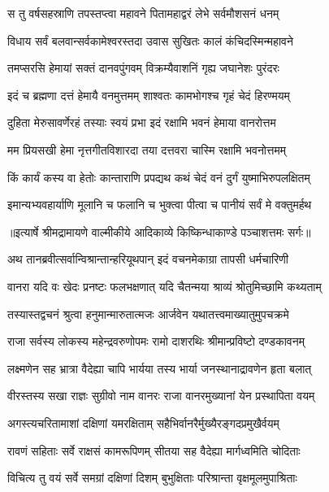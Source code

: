 \twolineshloka
{स तु वर्षसहस्राणि तपस्तप्त्वा महावने}
{पितामहाद्वरं लेभे सर्वमौशसनं धनम्} %

\twolineshloka
{विधाय सर्वं बलवान्सर्वकामेश्वरस्तदा}
{उवास सुखितः कालं कंचिदस्मिन्महावने} %

\twolineshloka
{तमप्सरसि हेमायां सक्तं दानवपुंगवम्}
{विक्रम्यैवाशनिं गृह्य जघानेशः पुरंदरः} %

\twolineshloka
{इदं च ब्रह्मणा दत्तं हेमायै वनमुत्तमम्}
{शाश्वतः कामभोगश्च गृहं चेदं हिरण्मयम्} %

\twolineshloka
{दुहिता मेरुसावर्णेरहं तस्याः स्वयं प्रभा}
{इदं रक्षामि भवनं हेमाया वानरोत्तम} %

\twolineshloka
{मम प्रियसखी हेमा नृत्तगीतविशारदा}
{तया दत्तवरा चास्मि रक्षामि भवनोत्तमम्} %

\twolineshloka
{किं कार्यं कस्य वा हेतोः कान्ताराणि प्रपद्यथ}
{कथं चेदं वनं दुर्गं युष्माभिरुपलक्षितम्} %

\twolineshloka
{इमान्यभ्यवहार्याणि मूलानि च फलानि च}
{भुक्त्वा पीत्वा च पानीयं सर्वं मे वक्तुमर्हथ} %


{॥इत्यार्षे श्रीमद्रामायणे वाल्मीकीये आदिकाव्ये किष्किन्धाकाण्डे पञ्चाशत्तमः सर्गः॥}


\twolineshloka
{अथ तानब्रवीत्सर्वान्विश्रान्तान्हरियूथपान्}
{इदं वचनमेकाग्रा तापसी धर्मचारिणी} %

\twolineshloka
{वानरा यदि वः खेदः प्रनष्टः फलभक्षणात्}
{यदि चैतन्मया श्राव्यं श्रोतुमिच्छामि कथ्यताम्} %

\twolineshloka
{तस्यास्तद्वचनं श्रुत्वा हनुमान्मारुतात्मजः}
{आर्जवेन यथातत्त्वमाख्यातुमुपचक्रमे} %

\twolineshloka
{राजा सर्वस्य लोकस्य महेन्द्रवरुणोपमः}
{रामो दाशरथिः श्रीमान्प्रविष्टो दण्डकावनम्} %

\twolineshloka
{लक्ष्मणेन सह भ्रात्रा वैदेह्या चापि भार्यया}
{तस्य भार्या जनस्थानाद्रावणेन हृता बलात्} %

\twolineshloka
{वीरस्तस्य सखा राज्ञः सुग्रीवो नाम वानरः}
{राजा वानरमुख्यानां येन प्रस्थापिता वयम्} %

\twolineshloka
{अगस्त्यचरितामाशां दक्षिणां यमरक्षिताम्}
{सहैभिर्वानरैर्मुख्यैरङ्गदप्रमुखैर्वयम्} %

\twolineshloka
{रावणं सहिताः सर्वे राक्षसं कामरूपिणम्}
{सीतया सह वैदेह्या मार्गध्वमिति चोदिताः} %

\twolineshloka
{विचित्य तु वयं सर्वे समग्रां दक्षिणां दिशम्}
{बुभुक्षिताः परिश्रान्ता वृक्षमूलमुपाश्रिताः} %

